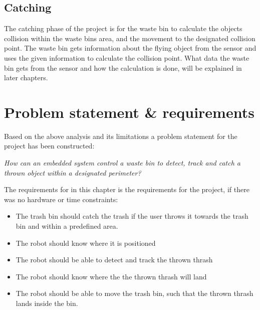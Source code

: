 \subsection{Catching}
\label{sec:CatchingAnalysis}
The catching phase of the project is for the waste bin to calculate the objects collision within the waste bins area, and the movement to the designated collision point. The waste bin gets information about the flying object from the sensor and uses the given information to calculate the collision point. What data the waste bin gets from the sensor and how the calculation is done, will be explained in later chapters. 

\section{Problem statement \& requirements}
\label{sec:Problem statement}
Based on the above analysis and its limitations a problem statement for the project has been constructed:

\textit{How can an embedded system control a waste bin to detect, track and catch a thrown object within a designated perimeter?}

The requirements for in this chapter is the requirements for the project, if there was no hardware or time constraints:

\begin{itemize}
\item The trash bin should catch the trash if the user throws it towards the trash bin and within a predefined area. 
\item The robot should know where it is positioned
\item The robot should be able to detect and track the thrown thrash
\item The robot should know where the the thrown thrash will land
\item The robot should be able to move the trash bin, such that the thrown thrash lands inside the bin.
\end{itemize}
